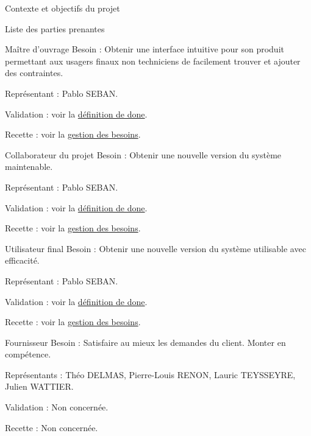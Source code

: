\documentclass[]{article}
\begin{document}
{\begin{section}{\label{sec:Contexte et objectifs du projet}Contexte et objectifs du projet}
\begin{subsection}{\label{sec:Liste des parties prenantes}Liste des parties prenantes}
         \begin{subsubsection}{\label{sec:Maître d’ouvrage}Maître d’ouvrage}
             Besoin : Obtenir une interface intuitive pour son produit permettant aux usagers finaux non techniciens de facilement trouver et ajouter des contraintes.

             Représentant : Pablo SEBAN.

             Validation : voir la \hyperref[sec:Définition de done]{définition de done}.

             Recette : voir la \hyperref[sec:Gestion des besoins]{gestion des besoins}.
         \end{subsubsection}

         \begin{subsubsection}{\label{sec:Collaborateur du projet}Collaborateur du projet}
             Besoin : Obtenir une nouvelle version du système maintenable.

             Représentant : Pablo SEBAN.

             Validation : voir la \hyperref[sec:Définition de done]{définition de done}.

             Recette : voir la \hyperref[sec:Gestion des besoins]{gestion des besoins}.
         \end{subsubsection}

         \begin{subsubsection}{\label{sec:Utilisateur final}Utilisateur final}
             Besoin : Obtenir une nouvelle version du système utilisable avec efficacité.

             Représentant : Pablo SEBAN.

             Validation : voir la \hyperref[sec:Définition de done]{définition de done}.

             Recette : voir la \hyperref[sec:Gestion des besoins]{gestion des besoins}.
         \end{subsubsection}

         \begin{subsubsection}{\label{sec:Fournisseur}Fournisseur}
             Besoin : Satisfaire au mieux les demandes du client.
             Monter en compétence.

             Représentants : Théo DELMAS, Pierre-Louis RENON, Lauric TEYSSEYRE, Julien WATTIER.

             Validation : Non concernée.

             Recette : Non concernée.
         \end{subsubsection}


\end{subsection}
\end{section}}
\end{document}
